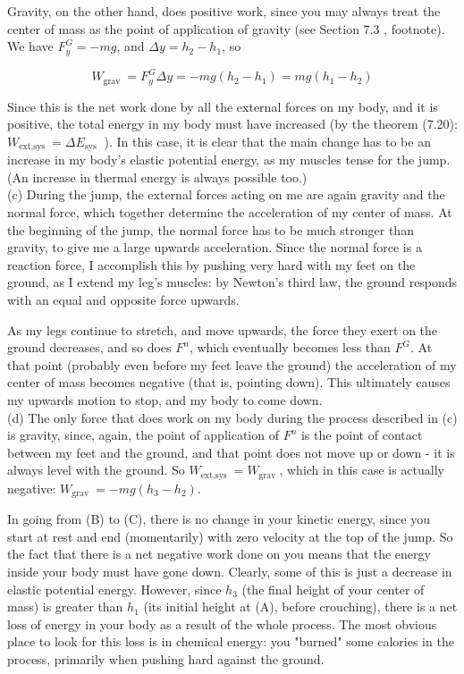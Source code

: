 \documentclass[10pt]{article}
\begin{document}
Gravity, on the other hand, does positive work, since you may always treat the center of mass as the point of application of gravity (see Section 7.3 , footnote). We have $F_{y}^{G}=-m g$, and $\Delta y=h_{2}-h_{1}$, so

$$
W_{\text {grav }}=F_{y}^{G} \Delta y=-m g\left(h_{2}-h_{1}\right)=m g\left(h_{1}-h_{2}\right)
$$

Since this is the net work done by all the external forces on my body, and it is positive, the total energy in my body must have increased (by the theorem (7.20): $W_{\text {ext,sys }}=\Delta E_{\text {sys }}$ ). In this case, it is clear that the main change has to be an increase in my body's elastic potential energy, as my muscles tense for the jump. (An increase in thermal energy is always possible too.)\\
(c) During the jump, the external forces acting on me are again gravity and the normal force, which together determine the acceleration of my center of mass. At the beginning of the jump, the normal force has to be much stronger than gravity, to give me a large upwards acceleration. Since the normal force is a reaction force, I accomplish this by pushing very hard with my feet on the ground, as I extend my leg's muscles: by Newton's third law, the ground responds with an equal and opposite force upwards.

As my legs continue to stretch, and move upwards, the force they exert on the ground decreases, and so does $F^{n}$, which eventually becomes less than $F^{G}$. At that point (probably even before my feet leave the ground) the acceleration of my center of mass becomes negative (that is, pointing down). This ultimately causes my upwards motion to stop, and my body to come down.\\
(d) The only force that does work on my body during the process described in (c) is gravity, since, again, the point of application of $F^{n}$ is the point of contact between my feet and the ground, and that point does not move up or down - it is always level with the ground. So $W_{\text {ext,sys }}=W_{\text {grav }}$, which in this case is actually negative: $W_{\text {grav }}=-m g\left(h_{3}-h_{2}\right)$.

In going from (B) to (C), there is no change in your kinetic energy, since you start at rest and end (momentarily) with zero velocity at the top of the jump. So the fact that there is a net negative work done on you means that the energy inside your body must have gone down. Clearly, some of this is just a decrease in elastic potential energy. However, since $h_{3}$ (the final height of your center of mass) is greater than $h_{1}$ (its initial height at (A), before crouching), there is a net loss of energy in your body as a result of the whole process. The most obvious place to look for this loss is in chemical energy: you "burned" some calories in the process, primarily when pushing hard against the ground.
\end{document}
